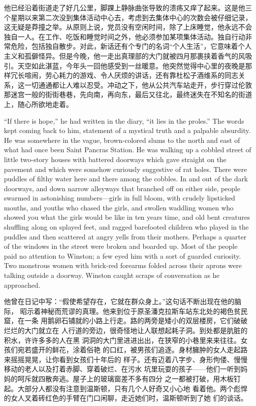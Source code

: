 \begin{paracol}{2}
\switchcolumn

他已经沿着街道走了好几公里，脚踝上静脉曲张导致的溃疡又痒了起来。这是他三个星期以来第二次没到集体活动中心去，考虑到去集体中心的次数会被仔细记录，这无疑是莽撞之举。从原则上说，党员没有空闲时间，除了上床睡觉，他永远不会独自一人。在工作、吃饭和睡觉时间之外，他必须参加某项集体活动。独自行动非常危险，包括独自散步。对此，新话还有个专门的名词``个人生活''，它意味着个人主义和孤僻怪异。但是今晚，他一走出真理部的大门就被四月那裹挟着香气的风吸引。天空如此湛蓝，今年头一回他感受到一丝暖意。他突然觉得中心里的夜晚是那样冗长喧闹，劳心耗力的游戏、令人厌烦的讲话，还有靠杜松子酒维系的同志关系，这一切通通都让人难以忍受。冲动之下，他从公共汽车站走开，步行穿过伦敦那迷宫一般的街街巷巷，先向南，再向东，最后又往北，最终迷失在不知名的街道上，随心所欲地走着。

\switchcolumn*

``If there is hope,'' he had written in the diary, ``it lies in the
proles.'' The words kept coming back to him, statement of a mystical
truth and a palpable absurdity. He was somewhere in the vague,
brown-colored slums to the north and east of what had once been Saint
Pancras Station. He was walking up a cobbled street of little two-story
houses with battered doorways which gave straight on the pavement and
which were somehow curiously suggestive of rat holes. There were puddles
of filthy water here and there among the cobbles. In and out of the dark
doorways, and down narrow alleyways that branched off on either side,
people swarmed in astonishing numbers---girls in full bloom, with
crudely lipsticked mouths, and youths who chased the girls, and swollen
waddling women who showed you what the girls would be like in ten years
time, and old bent creatures shuffling along on splayed feet, and ragged
barefooted children who played in the puddles and then scattered at
angry yells from their mothers. Perhaps a quarter of the windows in the
street were broken and boarded up. Most of the people paid no attention
to Winston; a few eyed him with a sort of guarded curiosity. Two
monstrous women with brick-red forearms folded across their aprons were
talking outside a doorway. Winston caught scraps of conversation as he
approached.

\switchcolumn

他曾在日记中写：``假使希望存在，它就在群众身上。''这句话不断出现在他的脑际，
昭示着神秘而荒谬的真理。他来到位于原圣潘克拉斯车站东北处的褐色贫民窟，在一条
用鹅卵石铺就的小路上行走。路的两旁是矮小的双层楼房，它们破破烂烂的大门就立在
人行道的旁边，很奇怪地让人联想起耗子洞。到处都是肮脏的积水，许许多多的人在黑
洞洞的大门里进进出出，在狭窄的小巷里来来往往。女孩们宛若盛开的鲜花，涂着俗艳
的口红，被男孩们追逐。身材臃肿的女人走起路来摇摇晃晃，让你看到女孩们十年后的
样子。还有迈着八字步、身形佝偻、慢慢移动的老人以及打着赤脚、穿着破烂、在污水
坑里玩耍的孩子——他们一听到妈妈的呵斥就四散奔逃。屋子上的玻璃窗差不多有四分
之一都被打破，用木板钉起。大部分人都没有注意到温斯顿，只有几个人好奇又小心地
看着他。两个彪悍的女人叉着砖红色的手臂在门口闲聊，走近她们时，温斯顿听到了她
们的谈话。


\end{paracol}
